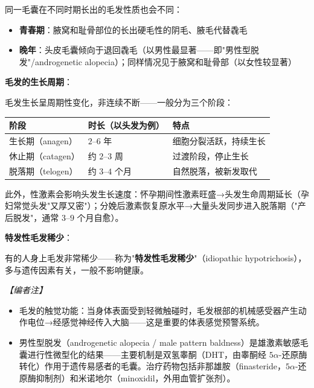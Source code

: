 \begin{enumerate}
同一毛囊在不同时期长出的毛发性质也会不同：
\begin{itemize}
	\item \textbf{青春期}：腋窝和耻骨部位的长出硬毛性的阴毛、腋毛代替毳毛
	\item \textbf{晚年}：头皮毛囊倾向于退回毳毛（以男性最显著——即"男性型脱发"/androgenetic alopecia）；同样情况见于腋窝和耻骨部（以女性较显著）
\end{itemize}

\vspace{0.5em}
\noindent\textbf{毛发的生长周期}：

毛发生长呈周期性变化，非连续不断——一般分为三个阶段：

\begin{center}\small
\begin{tabular}{|l|p{4cm}|p{5cm}|}
\hline
阶段 & 时长（以头发为例） & 特点 \\
\hline
生长期（anagen） & $2$--$6$ 年 & 细胞分裂活跃，持续生长 \\
休止期（catagen） & 约 $2$--$3$ 周 & 过渡阶段，停止生长 \\
脱落期（telogen） & 约 $3$--$4$ 个月 & 自然脱落，被新发取代 \\
\hline
\end{tabular}
\end{center}

此外，性激素会影响头发生长速度：怀孕期间性激素旺盛→头发生命周期延长（孕妇常觉头发"又厚又密"）；分娩后激素恢复原水平→大量头发同步进入脱落期（"产后脱发"，通常 $3$--$9$ 个月自愈）。

\vspace{0.5em}
\noindent\textbf{特发性毛发稀少}：

有的人身上毛发非常稀少——称为"\textbf{特发性毛发稀少}"（idiopathic hypotrichosis），多与遗传因素有关，一般不影响健康。

\vspace{0.5em}
\noindent\textit{【编者注】}
\begin{itemize}
	\item 毛发的触觉功能：当身体表面受到轻微触碰时，毛发根部的机械感受器产生动作电位→经感觉神经传入大脑——这是重要的体表感觉预警系统。
	\item 男性型脱发（androgenetic alopecia / male pattern baldness）是雄激素敏感毛囊进行性微型化的结果——主要机制是双氢睾酮（DHT，由睾酮经 $5\alpha$-还原酶转化）作用于遗传易感者的毛囊。治疗药物包括非那雄胺（finasteride，$5\alpha$-还原酶抑制剂）和米诺地尔（minoxidil，外用血管扩张剂）。
\end{itemize}


\end{enumerate}
